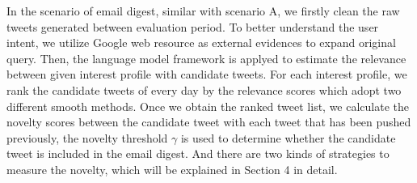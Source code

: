In the scenario of email digest, similar with scenario A,
we firstly clean the raw tweets generated between evaluation period.
To better understand the user intent,
we utilize Google web resource as external evidences to expand original query.
Then, the language model framework is applyed to estimate the relevance between given interest profile with candidate tweets.
For each interest profile,
we rank the candidate tweets of every day by the relevance scores which adopt two different smooth methods. 
Once we obtain the ranked tweet list,
we calculate the novelty scores between the candidate tweet with each tweet that has been pushed previously,
the novelty threshold $\gamma$ is used to determine whether the candidate tweet is included in the email digest.
And there are two kinds of strategies to measure the novelty,
which will be explained in Section 4 in detail.


